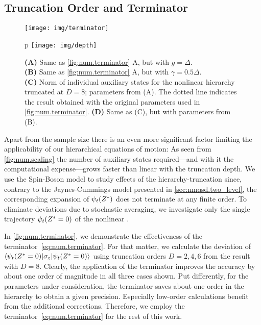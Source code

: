 \subsection{Truncation Order and Terminator}
\label{sub:num.spin_boson.depth}
%

\begin{figure}[p]
  \centering
  \texttt{[image: img/terminator]}
  \caption{%
    Deviation of $\qmean{\sigma_t} = \braket{\psi_t(\ZZ = 0)}{\psi_t(\ZZ = 0)}$ for truncation order $D = 2,4,6$ from the result for $D=8$.
    Parameters for the bath correlation function are $g = 0.5\Delta$,  $\gamma = \Delta$ and $\Omega = 0$.\\
    \textbf{(A)} Results obtained from nonlinear \NMSSE-hierarchy with terminator~\ref{eq:num.terminator}.\\
    \textbf{(B)} Same as (A), but simply neglecting auxiliary states beyond order $D$.
    \label{fig:num.terminator}
  }
 p \vspace{.5cm}
  \texttt{[image: img/depth]}
  \caption{%
    \textbf{(A)} Same as \autoref{fig:num.terminator} A, but with $g = \Delta$.\\
    \textbf{(B)} Same as \autoref{fig:num.terminator} A, but with $\gamma = 0.5\Delta$.\\
    \textbf{(C)} Norm of individual auxiliary states for the nonlinear hierarchy truncated at $D = 8$; parameters from (A).
    The dotted line indicates the result obtained with the original parameters used in \autoref{fig:num.terminator}.
    \textbf{(D)} Same as (C), but with parameters from (B).\\
    \label{fig:num.depth}
  }
\end{figure}
Apart from the sample size there is an even more significant factor limiting the applicability of our hierarchical equations of motion:
As seen from \autoref{fig:num.scaling} the number of auxiliary states required---and with it the computational expense---grows faster than linear with the truncation depth.
We use the Spin-Boson model to study effects of the hierarchy-truncation since, contrary to the Jaynes-Cummings model presented in \autoref{sec:nmqsd.two_level}, the corresponding expansion of $\psitZ$ does not terminate at any finite order.
To eliminate deviations due to stochastic averaging, we investigate only the single trajectory $\psi_t({Z}^* = 0)$ of the nonlinear \NMSSE.

In \autoref{fig:num.terminator}, we demonstrate the effectiveness of the terminator~\ref{eq:num.terminator}.
For that matter, we calculate the deviation of $\langle \psi_t({Z}^*=0) | \sigma_z | \psi_t({Z}^*=0) \rangle$ using truncation orders $D = 2,4,6$ from the result with $D=8$.
Clearly, the application of the terminator improves the accuracy by about one order of magnitude in all three cases shown.
Put differently, for the parameters under consideration, the terminator saves about one order in the hierarchy to obtain a given precision.
Especially low-order calculations benefit from the additional corrections.
Therefore, we employ the terminator~\ref{eq:num.terminator} for the rest of this work.

